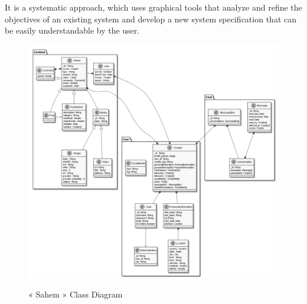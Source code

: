 It is a systematic approach, which uses graphical tools that analyze and refine the objectives of an existing system and develop a new system specification that can be easily understandable by the user.


\begin{figure}[!ht]
      \center
      \includegraphics[scale=0.40,angle=90]{assets/User.png}
      \label{fig:qweq}
      \caption{« Sahem » Class Diagram}
\end{figure}


